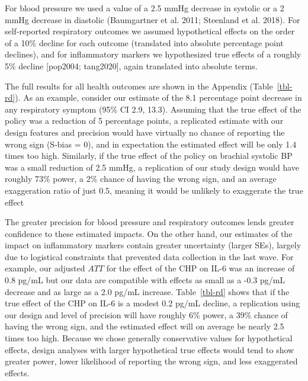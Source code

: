 \documentclass[
  letterpaper,
  DIV=11,
  numbers=noendperiod]{scrartcl}
\begin{document}
For blood pressure we used a value of a 2.5 mmHg decrease in systolic or
a 2 mmHg decrease in diastolic (Baumgartner et al. 2011; Steenland et
al. 2018). For self-reported respiratory outcomes we assumed
hypothetical effects on the order of a 10\% decline for each outcome
(translated into absolute percentage point declines), and for
inflammatory markers we hypothesized true effects of a roughly 5\%
decline {[}pop2004; tang2020{]}, again translated into absolute terms.

The full results for all health outcomes are shown in the Appendix
(Table~\ref{tbl-rd}). As an example, consider our estimate of the 8.1
percentage point decrease in any respiratory symptom (95\% CI 2.9,
13.3). Assuming that the true effect of the policy was a reduction of 5
percentage points, a replicated estimate with our design features and
precision would have virtually no chance of reporting the wrong sign
(S-bias = 0), and in expectation the estimated effect will be only 1.4
times too high. Similarly, if the true effect of the policy on brachial
systolic BP was a small reduction of 2.5 mmHg, a replication of our
study design would have roughly 73\% power, a 2\% chance of having the
wrong sign, and an average exaggeration ratio of just 0.5, meaning it
would be unlikely to exaggerate the true effect

The greater precision for blood pressure and respiratory outcomes lends
greater confidence to these estimated impacts. On the other hand, our
estimates of the impact on inflammatory markers  contain
greater uncertainty (larger SEs), largely due to logistical constraints
that prevented data collection in the last wave. For example, our
adjusted \(ATT\) for the effect of the CHP on IL-6 was an increase of
0.8 pg/mL but our data are compatible with effects as small as a -0.3
pg/mL decrease and as large as a 2.0 pg/mL increase. Table~\ref{tbl-rd}
shows that if the true effect of the CHP on IL-6 is a modest 0.2 pg/mL
decline, a replication using our design and level of precision will have
roughly 6\% power, a 39\% chance of having the wrong sign, and the
estimated effect will on average be nearly 2.5 times too high. Because
we chose generally conservative values for hypothetical effects, design
analyses with larger hypothetical true effects would tend to show
greater power, lower likelihood of reporting the wrong sign, and less
exaggerated effects.
\end{document}
